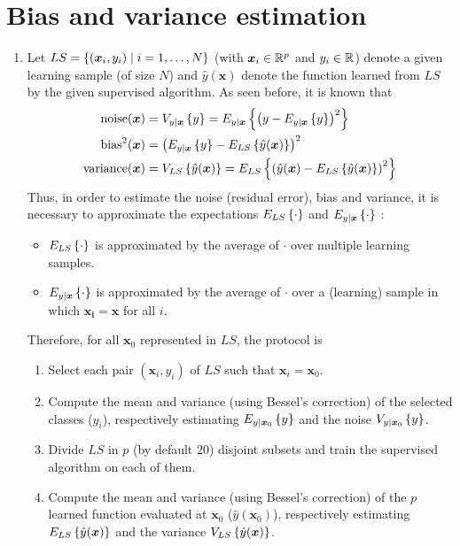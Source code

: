 \documentclass[a4paper, 12pt]{article}
\begin{document}
    \section{Bias and variance estimation}
    \begin{enumerate}[label=(\alph*)]
        \item Let $LS = \left\{(\bm{x}_i, y_i) \mid i = 1, \ldots, N\right\}$ (with $\bm{x}_i \in \mathbb{R}^p$ and $y_i \in \mathbb{R}$) denote a given learning sample (of size $N$) and $\hat{y}(\bm{x})$ denote the function learned from $LS$ by the given supervised algorithm. As seen before, it is known that
        \begin{align*}
            \text{noise}(\bm{x}) & = V_{y \mid \bm{x}} \left\{y\right\} = E_{y \mid \bm{x}} \left\{\left(y - E_{y \mid \bm{x}}\left\{y\right\}\right)^2\right\} \\
            \text{bias}^2(\bm{x}) & = \left(E_{y \mid \bm{x}} \left\{y\right\} - E_{LS} \left\{\hat{y}(\bm{x})\right\}\right)^2 \\
            \text{variance}(\bm{x}) & = V_{LS} \left\{\hat{y}(\bm{x})\right\} = E_{LS} \left\{\left(\hat{y}(\bm{x}) - E_{LS}\left\{\hat{y}(\bm{x})\right\}\right)^2\right\}
        \end{align*}
        Thus, in order to estimate the noise (residual error), bias and variance, it is necessary to approximate the expectations $E_{LS}\left\{\cdot\right\}$ and $E_{y \mid \bm{x}}\left\{\cdot\right\}$ :
        \begin{itemize}
            \item $E_{LS}\left\{\cdot\right\}$ is approximated by the average of $\cdot$ over multiple learning samples.
            \item $E_{y \mid \bm{x}}\left\{\cdot\right\}$ is approximated by the average of $\cdot$ over a (learning) sample in which $\bm{x_i} = \bm{x}$ for all $i$.
        \end{itemize}
        Therefore, for all $\bm{x}_0$ represented in $LS$, the protocol is
        \begin{enumerate}[label=\arabic*.]
            \item Select each pair $(\bm{x}_i, y_i)$ of $LS$ such that $\bm{x}_i = \bm{x}_0$.
            \item Compute the mean and variance (using Bessel's correction) of the selected classes ($y_i$), respectively estimating $E_{y \mid \bm{x}_0} \left\{y\right\}$ and the noise $V_{y \mid \bm{x}_0} \left\{y\right\}$.
            \item Divide $LS$ in $p$ (by default $20$) disjoint subsets and train the supervised algorithm on each of them.
            \item Compute the mean and variance (using Bessel's correction) of the $p$ learned function evaluated at $\bm{x}_0$ ($\hat{y}(\bm{x}_0)$), respectively estimating $E_{LS} \left\{\hat{y}(\bm{x})\right\}$ and the variance $V_{LS} \left\{\hat{y}(\bm{x})\right\}$.

\end{enumerate}
\end{enumerate}
\end{document}
